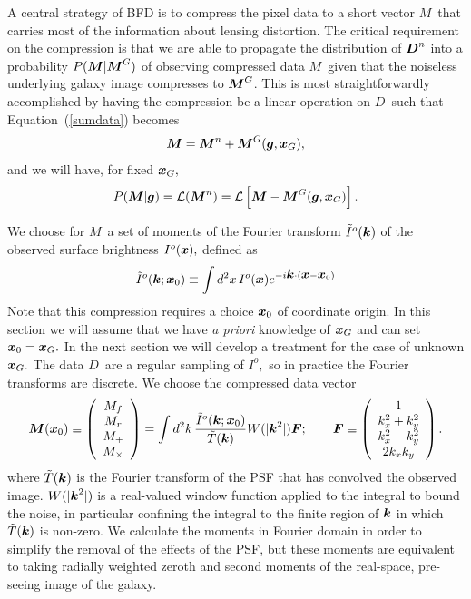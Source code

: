 \documentclass[11pt,preprint,flushrt]{aastex}
\def\eqq#1{Equation~(\ref{#1})}
\newcommand{\vecD}{\mbox{\boldmath $D$}}
\newcommand{\vecF}{\mbox{\boldmath $F$}}
\newcommand{\vecg}{\mbox{\boldmath $g$}}
\newcommand{\vecM}{\mbox{\boldmath $M$}}
\newcommand{\vecx}{\mbox{\boldmath $x$}}
\newcommand{\veck}{\mbox{\boldmath $k$}}
\newcommand{\likeli}{\mbox{$\mathcal{L}$}}
\newcommand\edit[1]{#1}
\begin{document}
A central strategy of BFD is to compress the pixel data to a short
vector \vecM\ 
that carries most of the information about lensing distortion.  The
critical requirement on the compression is that we are able to
propagate the distribution of $\vecD^n$ into a probability $P(\vecM |
\vecM^G)$ of observing compressed data \vecM\ given that the noiseless
underlying galaxy image compresses to $\vecM^G$.  This is most
straightforwardly accomplished by having the compression be a linear
operation on \vecD\ such that \eqq{sumdata} becomes
\begin{equation}
\vecM = \vecM^n + \vecM^G(\vecg, \vecx_G),
\label{summoments}
\end{equation}
and we will have, for fixed $\vecx_G,$
\begin{equation}
 P(\vecM | \vecg) = \likeli(\vecM^n) = \likeli\left[\vecM - \vecM^G(\vecg,\vecx_G)\right].
\end{equation}

We choose for \vecM\ a set of moments of the Fourier transform $\tilde
I^o(\veck)$ of the observed surface brightness $I^o(\vecx),$ defined
as
\begin{equation}
\label{ft}
\tilde I^o(\veck;\vecx_0) \equiv \int d^2x \, I^o(\vecx)
e^{-i\veck\cdot(\vecx-\vecx_0)}
\end{equation}
\edit{Note that this compression requires a choice $\vecx_0$ of coordinate
origin.  In this section we will assume that we have \textit{a priori}
knowledge of $\vecx_G$ and can set $\vecx_0=\vecx_G.$  In the next
section we will develop a treatment for the case of unknown $\vecx_G.$}
The data
\vecD\  are a regular sampling of $I^o,$ so in practice the Fourier
transforms are discrete.  We choose the compressed data vector
\begin{equation}
\label{moments}
\vecM(\vecx_0) \equiv \left( \begin{array}{c}
M_f \\
M_r \\
M_+ \\
M_\times
\end{array}
\right) = \int d^2k\, \frac{\tilde I^o(\veck;\vecx_0)}{\tilde T(\veck)}
W(|\veck^2|) \vecF; \qquad \vecF \equiv
\left( \begin{array}{c}
1 \\
k_x^2 + k_y^2 \\
k_x^2 - k_y^2 \\
2 k_x k_y
\end{array}
\right).
\end{equation}
where $\tilde T(\veck)$ is the Fourier transform of the PSF that has
convolved the observed image.  $W(|\veck^2|)$ 
is a real-valued window function applied to the integral to bound the noise, in
particular confining the integral to the finite region of $\veck$ in which
$\tilde T(\veck)$  is non-zero.  We calculate the moments in Fourier
domain in order to simplify the removal of the effects of the PSF, but
these moments are equivalent to taking radially weighted zeroth and
second moments of the real-space, pre-seeing image of the galaxy.
\end{document}
